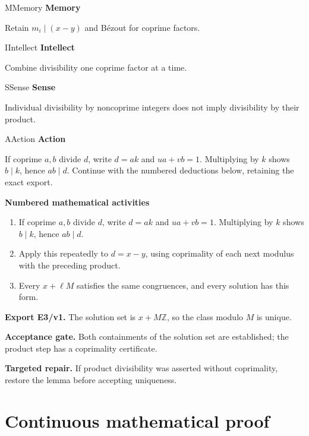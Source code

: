 \documentclass[preprint,12pt,aps,pra,showkeys,amsmath,amssymb,superscriptaddress,floatfix]{revtex4-2}
\theoremstyle{definition}
\theoremstyle{remark}
\newcommand{\mmfaculty}[3]{%
 \begin{mmfacultybox}{#1}{#2}
 {\sffamily\bfseries\color{MMBlue}#2}\par\smallskip #3
 \end{mmfacultybox}}
\newcommand{\field}[2]{\par\smallskip\noindent\textbf{#1.} #2\par}
\begin{document}
\mmfaculty{M}{Memory}{Retain \(m_i\mid(x-y)\) and Bézout for coprime factors.}

\mmfaculty{I}{Intellect}{Combine divisibility one coprime factor at a time.}

\mmfaculty{S}{Sense}{Individual divisibility by noncoprime integers does not imply
divisibility by their product.}

\mmfaculty{A}{Action}{If coprime \(a,b\) divide \(d\), write \(d=ak\) and \(ua+vb=1\).
Multiplying by \(k\) shows \(b\mid k\), hence \(ab\mid d\). Continue
with the numbered deductions below, retaining the exact export.}

\smallskip\noindent\textbf{Numbered mathematical activities}

\begin{enumerate}[label=N3.\arabic*,leftmargin=3.4em]

\item If coprime \(a,b\) divide \(d\), write \(d=ak\) and \(ua+vb=1\).
Multiplying by \(k\) shows \(b\mid k\), hence \(ab\mid d\).

\item Apply this repeatedly to \(d=x-y\), using coprimality of each next
modulus with the preceding product.

\item Every \(x+\ell M\) satisfies the same congruences, and every solution
has this form.

\end{enumerate}

\field{Export E3/v1}{The solution set is \(x+M\mathbb Z\), so the class modulo \(M\) is
unique.}

\field{Acceptance gate}{Both containments of the solution set are established; the product step
has a coprimality certificate.}

\field{Targeted repair}{If product divisibility was asserted without coprimality, restore the
lemma before accepting uniqueness.}

\clearpage\section{Continuous mathematical proof}\label{sec:proof}
\end{document}

